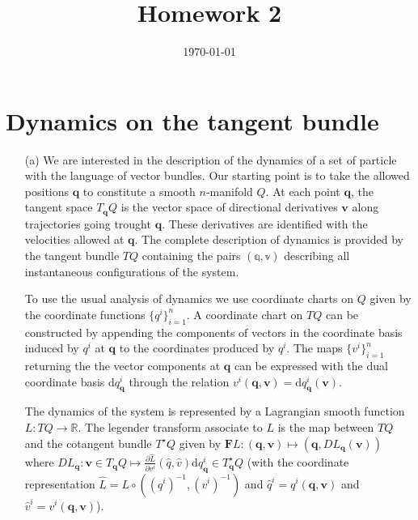 \documentclass[10pt, a4paper]{article}
\title{Homework 2} %
\author{\PA} %
\date{\today} %
\begin{document}
\maketitlepage

\maketableofcontents


\footnotesize{

\section{Dynamics on the tangent bundle}

\begin{enumerate}
  \item[(a)] We are interested in the description of the dynamics of a set of particle with the language of vector bundles. Our starting point is to take the allowed positions $\mathbf{q}$ to constitute a smooth $n$-manifold $Q$. At each point $\mathbf{q}$, the tangent space $T_{\mathbf{q}}Q$ is the vector space of directional derivatives $\mathbf{v}$ along trajectories going trought $\mathbf{q}$. These derivatives are identified with the velocities allowed at $\mathbf{q}$. The complete description of dynamics is provided by the tangent bundle $TQ$ containing the pairs $(\mathbb{q}, \mathbb{v})$ describing all instantaneous configurations of the system.\medskip
  
  
  To use the usual analysis of dynamics we use coordinate charts on $Q$ given by the coordinate functions $\{q^{i}\}_{i = 1}^{n}$. A coordinate chart on $TQ$ can be constructed by appending the components of vectors in the coordinate basis induced by $q^{i}$ at $\mathbf{q}$ to the coordinates produced by $q^{i}$. The maps $\{v^i\}_{i = 1}^{n}$ returning the the vector components at $\mathbf{q}$ can be expressed with the dual coordinate basis $\text{d}q^{i}_\mathbf{q}$ through the relation $v^{i}(\mathbf{q}, \mathbf{v}) = \text{d}q^{i}_\mathbf{q} (\mathbf{v})$.\medskip
  
  The dynamics of the system is represented by a Lagrangian smooth function $L: TQ \to \mathbb{R}$. The legender transform associate to $L$ is the map between $TQ$ and the cotangent bundle $T^\star Q$ given by $\mathbf{F}L : (\mathbf{q}, \mathbf{v}) \mapsto (\mathbf{q}, DL_\mathbf{q}(\mathbf{v}))$ where $DL_\mathbf{q} : \mathbf{v} \in T_{\mathbf{q}} Q \mapsto \frac{\partial \hat{L}}{\partial v^i} (\hat{q}, \hat{v}) \text{d}q^{i}_{\mathbf{q}} \in T_\mathbf{q}^\star Q$ (with the coordinate representation $\hat{L} = L \circ ((q^i)^{-1}, (v^i)^{-1})$ and $\hat{q}^i = q^{i}(\mathbf{q}, \mathbf{v})$ and $\hat{v}^i = v^{i}(\mathbf{q}, \mathbf{v})$).\medskip 
  

\end{enumerate}}
\end{document}
